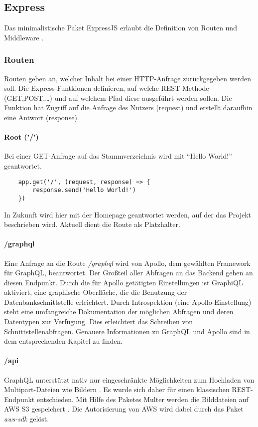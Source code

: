 \subsection{Express}
Das minimalistische
Paket ExpressJS erlaubt die Definition von Routen und Middleware \cite{be:express}\cite{be:expressRouting}\cite{be:expressMiddleware}. \\

\subsubsection{Routen}
Routen geben an, welcher Inhalt bei einer HTTP-Anfrage zurückgegeben werden soll.
Die Express-Funtkionen definieren, auf welche REST-Methode (GET,POST,\dots) und auf welchem Pfad diese ausgeführt werden sollen.
Die Funktion hat Zugriff auf die Anfrage des Nutzers (request) und erstellt daraufhin eine Antwort (response).


\paragraph{Root ('/')\\}
Bei einer GET-Anfrage auf das Stammverzeichnis wird mit \enquote{Hello World!} geantwortet.
\begin{lstlisting}
    app.get('/', (request, response) => {
        response.send('Hello World!')
    })
\end{lstlisting}
In Zukunft wird hier mit der Homepage geantwortet werden, auf der das Projekt beschrieben wird.
Aktuell dient die Route als Platzhalter.

\paragraph{/graphql\\}
Eine Anfrage an die Route \textit{/graphql} wird von Apollo, dem gewählten Framework für GraphQL, beantwortet.
Der Großteil aller Abfragen an das Backend gehen an diesen Endpunkt.
Durch die für Apollo getätigten Einstellungen ist GraphiQL aktiviert, eine graphische Oberfläche, die die Benutzung der Datenbankschnittstelle erleichtert.
Durch Introspektion (eine Apollo-Einstellung) steht eine umfangreiche Dokumentation der möglichen Abfragen und deren Datentypen zur Verfügung.
Dies erleichtert das Schreiben von Schnittstellenabfragen.
Genauere Informationen zu GraphQL und Apollo sind in dem entsprechenden Kapitel zu finden.

\paragraph{/api\\}
GraphQL unterstützt nativ nur eingeschränkte Möglichkeiten zum Hochladen von Multipart-Dateien wie Bildern \cite{be:graphQlTypes}.
Es wurde sich daher für einen klassischen REST-Endpunkt entschieden.
Mit Hilfe des Paketes Multer werden die Bilddateien auf AWS S3 gespeichert \cite{be:multer}\cite{be:multerS3}.
Die Autorisierung von AWS wird dabei durch das Paket \textit{aws-sdk} gelöst.\\

